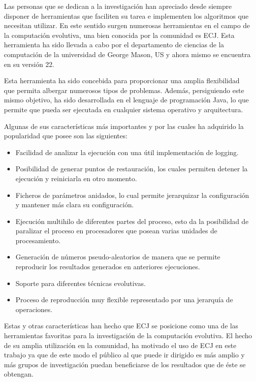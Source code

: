 Las personas que se dedican a la investigaci\'on han apreciado desde siempre disponer de herramientas que faciliten su tarea e implementen los algoritmos que necesitan utilizar. En este sentido surgen numerosas herramientas en el campo de la computación evolutiva, una bien conocida por la comunidad es ECJ. Esta herramienta ha sido llevada a cabo por el departamento de ciencias de la computación de la universidad de George Mason, US y ahora mismo se encuentra en su versi\'on 22.

Esta herramienta ha sido concebida para proporcionar una amplia flexibilidad que permita albergar numerosos tipos de problemas. Adem\'as, persiguiendo este mismo objetivo, ha sido desarrollada en el lenguaje de programación Java, lo que permite que pueda ser ejecutada en cualquier sistema operativo y arquitectura.

Algunas de sus características m\'as importantes y por las cuales ha adquirido la popularidad que posee son las siguientes:

\begin{itemize}
	\item Facilidad de analizar la ejecución con una \'util implementación de logging.
	\item Posibilidad de generar puntos de restauración, los cuales permiten detener la ejecución y reiniciarla en otro momento.
	\item Ficheros de parámetros anidados, lo cual permite jerarquizar la configuración y mantener m\'as clara su configuración.
	\item Ejecución multihilo de diferentes partes del proceso, esto da la posibilidad de paralizar el proceso en procesadores que posean varias unidades de procesamiento.
	\item Generación de n\'umeros pseudo-aleatorios de manera que se permite reproducir los resultados generados en anteriores ejecuciones.
	\item Soporte para diferentes técnicas evolutivas.
	\item Proceso de reproducción muy flexible representado por una jerarquía de operaciones.
\end{itemize}

Estas y otras características han hecho que ECJ se posicione como una de las herramientas favoritas para la investigación de la computación evolutiva. El hecho de su amplia utilización en la comunidad, ha motivado el uso de ECJ en este trabajo ya que de este modo el p\'ublico al que puede ir dirigido es m\'as amplio y m\'as grupos de investigación puedan beneficiarse de los resultados que de \'este se obtengan.

